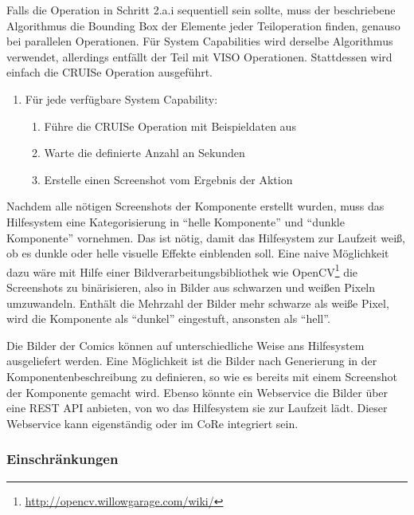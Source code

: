 \documentclass[
	headsepline,
	footsepline,
	fontsize=12pt,
	bibliography=totoc
]{scrbook}
\begin{document}
Falls die Operation in Schritt 2.a.i sequentiell sein sollte, muss der beschriebene Algorithmus die Bounding Box der Elemente jeder Teiloperation finden, genauso bei parallelen Operationen. Für System Capabilities wird derselbe Algorithmus verwendet, allerdings entfällt der Teil mit VISO Operationen. Stattdessen wird einfach die CRUISe Operation ausgeführt.

\begin{enumerate}
	\item Für jede verfügbare System Capability:
	\begin{enumerate}
		\item Führe die CRUISe Operation mit Beispieldaten aus
		\item Warte die definierte Anzahl an Sekunden
		\item Erstelle einen Screenshot vom Ergebnis der Aktion
	\end{enumerate}
\end{enumerate}


Nachdem alle nötigen Screenshots der Komponente erstellt wurden, muss das Hilfesystem eine Kategorisierung in \enquote{helle Komponente} und \enquote{dunkle Komponente} vornehmen. Das ist nötig, damit das Hilfesystem zur Laufzeit weiß, ob es dunkle oder helle visuelle Effekte einblenden soll. Eine naive Möglichkeit dazu wäre mit Hilfe einer Bildverarbeitungsbibliothek wie OpenCV\footnote{\url{http://opencv.willowgarage.com/wiki/}} die Screenshots zu binärisieren, also in Bilder aus schwarzen und weißen Pixeln umzuwandeln. Enthält die Mehrzahl der Bilder mehr schwarze als weiße Pixel, wird die Komponente als \enquote{dunkel} eingestuft, ansonsten als \enquote{hell}.


Die Bilder der Comics können auf unterschiedliche Weise ans Hilfesystem ausgeliefert werden. Eine Möglichkeit ist die Bilder nach Generierung in der Komponentenbeschreibung zu definieren, so wie es bereits mit einem Screenshot der Komponente gemacht wird. Ebenso könnte ein Webservice die Bilder über eine REST API anbieten, von wo das Hilfesystem sie zur Laufzeit lädt. Dieser Webservice kann eigenständig oder im CoRe integriert sein.

\subsubsection{Einschränkungen}
\label{section:konzeption:bedienung:generierung:einschraenkungen}
\end{document}
